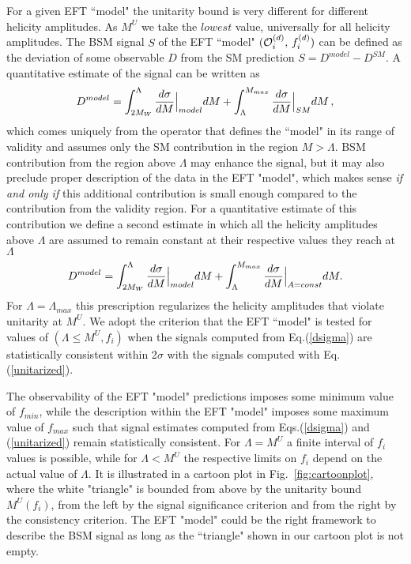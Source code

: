 For a given EFT ``model" the unitarity bound is very different for  different helicity amplitudes.
As  $M^U$ we take  the $lowest$ value, universally for all helicity 
amplitudes. 
The BSM signal  $S$ of the EFT ``model" $({\cal O}_i^{(d)},\,f_i^{(d)})$ 
can be defined as the deviation of some observable $D$ from the SM prediction 
$S=D^{model}-D^{SM}$.
A quantitative estimate of the signal can be written as
\small
\begin{equation} 
D^{model}=\int^{\Lambda}_{2M_W}\frac{d\sigma}{dM} \Bigl|_{model} dM +\int_{\Lambda}^{M_{max}}\frac{d\sigma}{dM}\Bigr|_{SM} dM\,,
\label{dsigma}
\end{equation}
\normalsize
which comes uniquely from the operator that defines the ``model" in its range
of validity and assumes only the SM contribution in the region $M>\Lambda$.
BSM contribution from the region above $\Lambda$   may enhance the signal, but it may also 
preclude proper description of the data in the EFT  "model",
which makes sense {\it if and only if} this additional contribution is small enough  
compared to the contribution from the validity region.  
For a  quantitative estimate of this 
contribution we define a second estimate in which  all the helicity amplitudes above 
$\Lambda$ are assumed to remain 
constant at their respective values they reach at $\Lambda$
\small
\begin{equation}
D^{model}=\int^{\Lambda}_{2M_W}\frac{d\sigma}{dM}\Bigl|_{model} dM +\int_{\Lambda}^{M_{max}}\frac{d\sigma}{dM}\Bigr|_{A=const} dM.
\label{unitarized}
\end{equation}
\normalsize
For $\Lambda = \Lambda_{max}$ this prescription regularizes the helicity amplitudes that violate unitarity at $M^U$. 
We adopt the criterion that the EFT ``model" is tested for values of $(\Lambda\leq M^U, f_i)$ 
when the signals computed from Eq.(\ref{dsigma}) are statistically consistent 
within 2$\sigma$ with the signals computed with Eq.(\ref{unitarized}).

The observability of  the EFT "model" predictions imposes some minimum value of $f_{min}$, while the description within the EFT "model" imposes some 
maximum value of $f_{max}$ such that signal
estimates computed from Eqs.(\ref{dsigma}) and (\ref{unitarized}) remain 
statistically consistent.  
For $\Lambda=M^U$ a finite interval of $f_i$ values is possible, while 
for $\Lambda <M^U$ the  respective limits on $f_i$  depend on the actual value of $\Lambda$. It is illustrated in 
a cartoon plot in Fig.~\ref{fig:cartoonplot}, where the white "triangle" is bounded from 
above by the unitarity bound $M^U(f_i)$, from the left by the signal significance criterion 
and from the right by the consistency criterion.
The EFT "model" could be the right framework to describe the  BSM signal as long as the ``triangle"
shown in our cartoon plot is not empty.  







